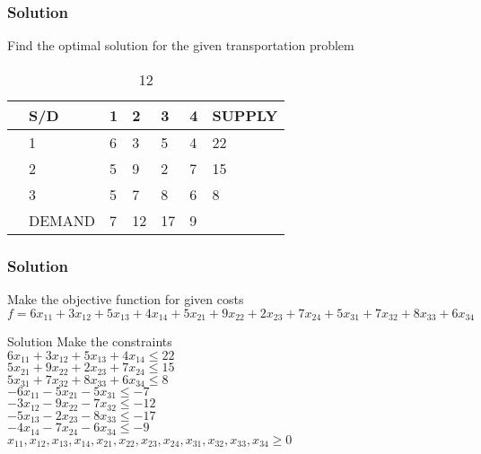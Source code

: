 \documentclass{beamer}
\begin{document}

\begin{frame}
\frametitle{Solution}
\begin{problem} 
Find the optimal solution for the given transportation problem
\begin{table}[!h]
\begin{center}
\begin{tabular}{l  l | l l l l | l  }
                 
                 & S/D & 1 & 2 & 3 & 4 &  SUPPLY  \\
\hline
& 1 & 6 & 3 & 5 & 4 & 22 \\ 
& 2 & 5 & 9 & 2 & 7 & 15  \\ 
& 3 & 5 & 7 & 8 & 6 & 8 \\ 
\hline
&DEMAND& 7&12&17&9\\ 
\end{tabular}
\end{center}
\caption{12}
\end{table}
\end{problem}
\end{frame}


\begin{frame}
\frametitle{Solution}
\item 
Make the objective function for given costs
\\

$
f=6x_{11}+3x_{12}+5x_{13}+4x_{14}+
5x_{21}+9x_{22}+2x_{23}+7x_{24}+
5x_{31}+7x_{32}+8x_{33}+6x_{34} 
$
\\
\item 
\end{frame}





\begin{frame}{Solution}
Make the constraints
\\
$
6x_{11}+3x_{12}+5x_{13}+4x_{14} \leq 22$ \\$
5x_{21}+9x_{22}+2x_{23}+7x_{24} \leq 15$ \\$
5x_{31}+7x_{32}+8x_{33}+6x_{34} \leq 8$ \\$
-6x_{11}-5x_{21}-5x_{31} \leq -7  $ \\$
-3x_{12}-9x_{22}-7x_{32} \leq -12 $ \\$
-5x_{13}-2x_{23}-8x_{33} \leq -17 $ \\$
-4x_{14}-7x_{24}-6x_{34} \leq -9 $ \\$
x_{11},x_{12},x_{13},x_{14},x_{21},x_{22},x_{23},x_{24},
x_{31},x_{32},x_{33},x_{34} \geq 0
$
\end{frame}
\end{document}
